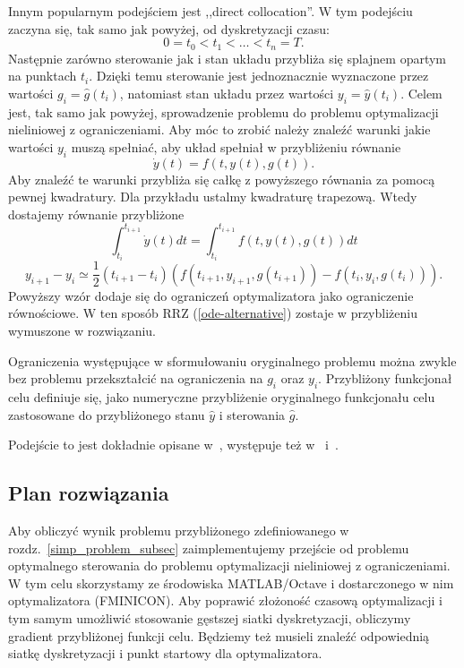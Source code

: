 \documentclass[11pt]{article}
\begin{document}
Innym popularnym podejściem jest ,,direct collocation''. W tym podejściu zaczyna się, tak samo jak powyżej, od dyskretyzacji czasu:
\begin{equation}
  0 = t_0 < t_1 < \ldots < t_n = T.
\end{equation}
Następnie zarówno sterowanie jak i stan układu przybliża się splajnem opartym na punktach $t_i$. Dzięki temu sterowanie jest jednoznacznie wyznaczone przez wartości $g_i = \hat{g}(t_i)$, natomiast stan układu przez wartości $y_i = \hat{y}(t_i)$. Celem jest, tak samo jak powyżej, sprowadzenie problemu do problemu optymalizacji nieliniowej z ograniczeniami. Aby móc to zrobić należy znaleźć warunki jakie wartości $y_i$ muszą spełniać, aby układ spełniał w przybliżeniu równanie
\begin{equation}\label{ode-alternative}
  \dot{y}(t) = f(t,y(t),g(t)).
\end{equation}
Aby znaleźć te warunki przybliża się całkę z powyższego równania za pomocą pewnej kwadratury. Dla przykładu ustalmy kwadraturę trapezową. Wtedy dostajemy równanie przybliżone
\begin{equation}
  \int_{t_i}^{t_{i+1}} \dot{y}(t)dt = \int_{t_i}^{t_{i+1}} f(t,y(t),g(t))dt
\end{equation}
\begin{equation}
  y_{i+1} - y_{i} \simeq \frac{1}{2}(t_{i+1}-t_i)(f(t_{i+1}, y_{i+1}, g(t_{i+1})) - f(t_i, y_i, g(t_i))).
\end{equation}
Powyższy wzór dodaje się do ograniczeń optymalizatora jako ograniczenie równościowe. W ten sposób RRZ (\ref{ode-alternative}) zostaje w przybliżeniu wymuszone w rozwiązaniu.

Ograniczenia występujące w sformułowaniu oryginalnego problemu można zwykle bez problemu przekształcić na ograniczenia na $g_i$ oraz $y_i$. Przybliżony funkcjonał celu definiuje się, jako numeryczne przybliżenie oryginalnego funkcjonału celu zastosowane do przybliżonego stanu $\hat{y}$ i sterowania $\hat{g}$.

Podejście to jest dokładnie opisane w~\cite{Kelly}, występuje też w~\cite{diehl} i~\cite{rao-methods}.

\subsection{Plan rozwiązania}
Aby obliczyć wynik problemu przybliżonego zdefiniowanego w rozdz.~\ref{simp_problem_subsec} zaimplementujemy przejście od problemu optymalnego sterowania do problemu optymalizacji nieliniowej z ograniczeniami. W tym celu skorzystamy ze środowiska MATLAB/Octave i dostarczonego w nim optymalizatora (FMINICON). Aby poprawić złożoność czasową optymalizacji i tym samym umożliwić stosowanie gęstszej siatki dyskretyzacji, obliczymy gradient przybliżonej funkcji celu. Będziemy też musieli znaleźć odpowiednią siatkę dyskretyzacji i punkt startowy dla optymalizatora.
\end{document}
